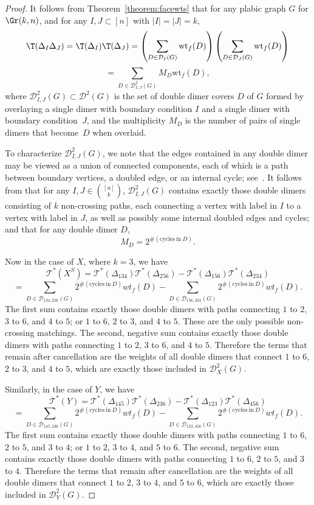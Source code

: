 \begin{proof}
It follows from Theorem~\ref{theorem:facewts} that for any plabic graph $G$ for $\Gr(k,n)$, and for any $I,J \subset [n]$ with $|I|=|J|=k$,
\[\T(\Delta_I\Delta_J) =\T(\Delta_I)\T(\Delta_J)= \left(\sum_{D \in \mathcal{D}_I(G)} \text{wt}_f(D)\right)\left(\sum_{D \in \mathcal{D}_J(G)} \text{wt}_f(D)\right)\]
\[=\sum_{D \in \mathcal{D}_{I,J}^2(G)}M_D \text{wt}_f(D),\]
where $\mathcal{D}_{I,J}^2(G) \subset \mathcal{D}^2(G)$ is the set of double dimer covers $D$ of $G$ formed by overlaying a single dimer with boundary condition $I$ and a single dimer with boundary condition~$J$, and the multiplicity $M_D$ is the number of pairs of single dimers that become~$D$ when overlaid.

To characterize $\mathcal{D}_{I,J}^2(G)$, we note that the edges contained in any double dimer may be viewed as a union of connected components, each of which is a path between boundary vertices, a doubled edge, or an internal cycle; see~\cite{kuo04}. It follows from \cite[Theorem 3.1]{lam2015} that for any $I,J \in \binom{[n]}{k}$, $\mathcal{D}_{I,J}^2(G)$ contains exactly those double dimers consisting of $k$ non-crossing paths, each connecting a vertex with label in $I$ to a vertex with label in $J$, as well as possibly some internal doubled edges and cycles; and that for any double dimer $D$,
\[M_D=2^{\# (\mathrm{cycles~in~}D)}.\]

Now in the case of $X$, where $k=3$, we have
\[\mathscr{T}^*(X^S)=\mathscr{T}^*(\Delta_{134})\mathscr{T}^*(\Delta_{256})-\mathscr{T}^*(\Delta_{156})\mathscr{T}^*(\Delta_{234})\]
\[=\sum_{D \in \mathcal{D}_{134,256}(G)} 2^{\#( \mathrm{cycles~in~}D)}wt_f(D) - \sum_{D \in \mathcal{D}_{156,234}(G)} 2^{\# (\mathrm{cycles~in~}D)}wt_f(D).\]
The first sum contains exactly those double dimers with paths connecting $1$ to $2$, $3$ to $6$, and $4$ to $5$; or $1$ to $6$, $2$ to $3$, and $4$ to $5$. These are the only possible non-crossing matchings. The second, negative sum contains exactly those double dimers with paths connecting $1$ to $2$, $3$ to $6$, and $4$ to $5$. Therefore the terms that remain after cancellation are the weights of all double dimers that connect $1$ to $6$, $2$ to $3$, and $4$ to $5$, which are exactly those included in $\mathcal{D}_{X}^2(G)$.

Similarly, in the case of $Y$, we have
\[\mathscr{T}^*(Y)=\mathscr{T}^*(\Delta_{145})\mathscr{T}^*(\Delta_{236})-\mathscr{T}^*(\Delta_{123})\mathscr{T}^*(\Delta_{456})\]
\[=\sum_{D \in \mathcal{D}_{145,236}(G)} 2^{\#( \mathrm{cycles~in~}D)}wt_f(D) - \sum_{D \in \mathcal{D}_{123,456}(G)} 2^{\# (\mathrm{cycles~in~}D)}wt_f(D).\]
The first sum contains exactly those double dimers with paths connecting $1$ to $6$, $2$ to $5$, and $3$ to $4$; or $1$ to $2$, $3$ to $4$, and $5$ to $6$. The second, negative sum contains exactly those double dimers with paths connecting $1$ to $6$, $2$ to $5$, and $3$ to $4$. Therefore the terms that remain after cancellation are the weights of all double dimers that connect $1$ to $2$, $3$ to $4$, and $5$ to $6$, which are exactly those included in $\mathcal{D}_{Y}^2(G)$.


\end{proof}
